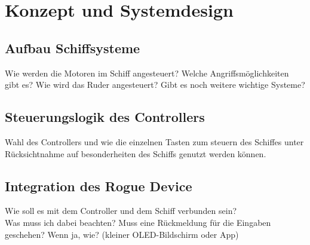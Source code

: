 \chapter{Konzept und Systemdesign}

\section{Aufbau Schiffsysteme}
Wie werden die Motoren im Schiff angesteuert?
Welche Angriffsmöglichkeiten gibt es?
Wie wird das Ruder angesteuert?
Gibt es noch weitere wichtige Systeme?

\section{Steuerungslogik des Controllers}
Wahl des Controllers und wie die einzelnen Tasten zum steuern des Schiffes unter Rücksichtnahme auf 
besonderheiten des Schiffs genutzt werden können.

\section{Integration des Rogue Device}
Wie soll es mit dem Controller und dem Schiff verbunden sein?
\\
Was muss ich dabei beachten?
Muss eine Rückmeldung für die Eingaben geschehen? Wenn ja, wie?
(kleiner OLED-Bildschirm oder App)

